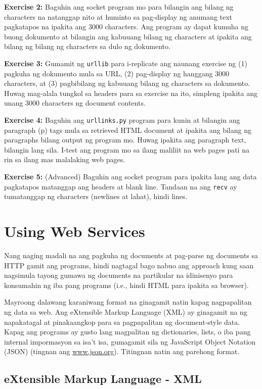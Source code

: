 \documentclass[10pt,]{book}
\begin{document}
\textbf{Exercise 2:} Baguhin ang socket program mo para bilangin ang
bilang ng characters na natanggap nito at huminto sa pag-display ng
anumang text pagkatapos na ipakita ang 3000 characters. Ang program ay
dapat kumuha ng buong dokumento at bilangin ang kabuuang bilang ng
characters at ipakita ang bilang ng bilang ng characters sa dulo ng
dokumento.

\textbf{Exercise 3:} Gumamit ng \texttt{urllib} para i-replicate ang
naunang exercise ng (1) pagkuha ng dokumento mula sa URL, (2)
pag-display ng hanggang 3000 characters, at (3) pagbibilang ng kabuuang
bilang ng characters sa dokumento. Huwag mag-alala tungkol sa headers
para sa exercise na ito, simpleng ipakita ang unang 3000 characters ng
document contents.

\textbf{Exercise 4:} Baguhin ang \texttt{urllinks.py} program para kunin
at bilangin ang paragraph (p) tags mula sa retrieved HTML document at
ipakita ang bilang ng paragraphs bilang output ng program mo. Huwag
ipakita ang paragraph text, bilangin lang sila. I-test ang program mo sa
ilang maliliit na web pages pati na rin sa ilang mas malalaking web
pages.

\textbf{Exercise 5:} (Advanced) Baguhin ang socket program para ipakita
lang ang data pagkatapos matanggap ang headers at blank line. Tandaan na
ang \texttt{recv} ay tumatanggap ng characters (newlines at lahat),
hindi lines.

\chapter{Using Web Services}\label{using-web-services}

Nang naging madali na ang pagkuha ng documents at pag-parse ng documents
sa HTTP gamit ang programs, hindi nagtagal bago nabuo ang approach kung
saan nagsimula tayong gumawa ng documents na partikular na idinisenyo
para konsumahin ng iba pang programs (i.e., hindi HTML para ipakita sa
browser).

Mayroong dalawang karaniwang format na ginagamit natin kapag
nagpapalitan ng data sa web. Ang eXtensible Markup Language (XML) ay
ginagamit na ng napakatagal at pinakaangkop para sa pagpapalitan ng
document-style data. Kapag ang programs ay gusto lang magpalitan ng
dictionaries, lists, o iba pang internal impormasyon sa isa't isa,
gumagamit sila ng JavaScript Object Notation (JSON) (tingnan ang
\href{http://www.json.org}{www.json.org}). Titingnan natin ang parehong
format.

\section{eXtensible Markup Language -
XML}\label{extensible-markup-language---xml}
\end{document}
